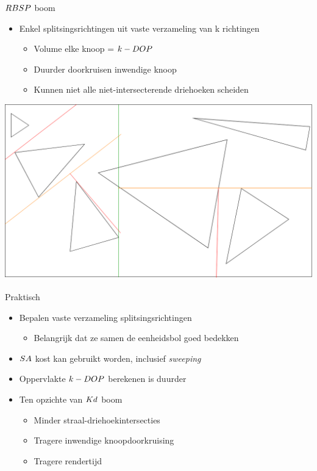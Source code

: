 \documentclass[11pt,t]{beamer}
\begin{document}
\begin{frame}{$RBSP$ boom}
	\begin{itemize}
		\item Enkel splitsingsrichtingen uit vaste verzameling van k richtingen
			\begin{itemize}
				\item Volume elke knoop = $k-DOP$
				\item Duurder doorkruisen inwendige knoop
				\item Kunnen niet alle niet-intersecterende driehoeken scheiden
			\end{itemize}
	\end{itemize}
	\pause
	\vspace{5pt}
	\hspace{5pt}
	\includegraphics[height=0.5\paperheight]{../img/splitsing-RBSP}
\end{frame}

\begin{frame}{Praktisch}
	\begin{itemize}
	\item Bepalen vaste verzameling splitsingsrichtingen
	\begin{itemize}
		\item Belangrijk dat ze samen de eenheidsbol goed bedekken
	\end{itemize}
	\item $SA$ kost kan gebruikt worden, inclusief \textit{sweeping}
	\item Oppervlakte $k-DOP$ berekenen is duurder
	\item Ten opzichte van $Kd$ boom
		\begin{itemize}
			\item Minder straal-driehoekintersecties
			\item Tragere inwendige knoopdoorkruising
			\item Tragere rendertijd
		\end{itemize}
	\end{itemize}
\end{frame}
\end{document}
